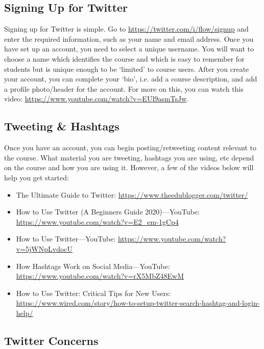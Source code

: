 \subsection{Signing Up for Twitter}

Signing up for Twitter is simple. Go to \url{https://twitter.com/i/flow/signup} and enter the required information, such as your name and email address. Once you have set up an account, you need to select a unique username. You will want to choose a name which identifies the course and which is easy to remember for students but is unique enough to be `limited' to course users. After you create your account, you can complete your `bio', i.e. add a course description, and add a profile photo/header for the account. For more on this, you can watch this video: \url{https://www.youtube.com/watch?v=EUl9asmTsJw}. 



\subsection{Tweeting \& Hashtags}

Once you have an account, you can begin posting/retweeting content relevant to the course. What material you are tweeting, hashtags you are using, etc depend on the course and how you are using it. However, a few of the videos below will help you get started:

	\begin{itemize}
	\item The Ultimate Guide to Twitter: \url{https://www.theedublogger.com/twitter/}
	\item How to Use Twitter (A Beginners Guide 2020)---YouTube: \url{https://www.youtube.com/watch?v=E2_em-1gCp4}
	\item How to Use Twitter---YouTube: \url{https://www.youtube.com/watch?v=5jWNpLvdocU}
	\item How Hashtags Work on Social Media---YouTube: \url{https://www.youtube.com/watch?v=rX5MbZ48EwM}
	\item How to Use Twitter: Critical Tips for New Users: \url{https://www.wired.com/story/how-to-setup-twitter-search-hashtag-and-login-help/}
	\end{itemize}



\subsection{Twitter Concerns}

